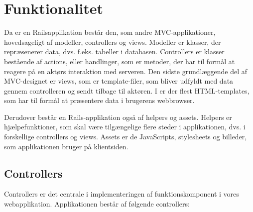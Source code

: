 \section{Funktionalitet}
\label{sec:funktionalitet}

Da {\Foodl} er en Railsapplikation består den, som andre MVC-applikationer, hovedsageligt af modeller, controllers og views. Modeller er klasser, der repræsenerer data, dvs. f.eks. tabeller i databasen. Controllers er klasser bestående af actions, eller handlinger, som er metoder, der har til formål at reagere på en aktørs interaktion med serveren. Den sidste grundlæggende del af MVC-designet er views, som er template-filer, som bliver udfyldt med data gennem controlleren og sendt tilbage til aktøren. I {\Foodl} er der flest HTML-templates, som har til formål at præsentere data i brugerens webbrowser.

Derudover består en Rails-applikation også af helpers og assets. Helpers er hjælpefunktioner, som skal være tilgængelige flere steder i applikationen, dvs. i forskellige controllers og views. Assets er de JavaScripts, stylesheets og billeder, som applikationen bruger på klientsiden. 

\subsection{Controllers}
\label{sec:controllers}

Controllers er det centrale i implementeringen af funktionskomponent i vores webapplikation. Applikationen består af følgende controllers:


